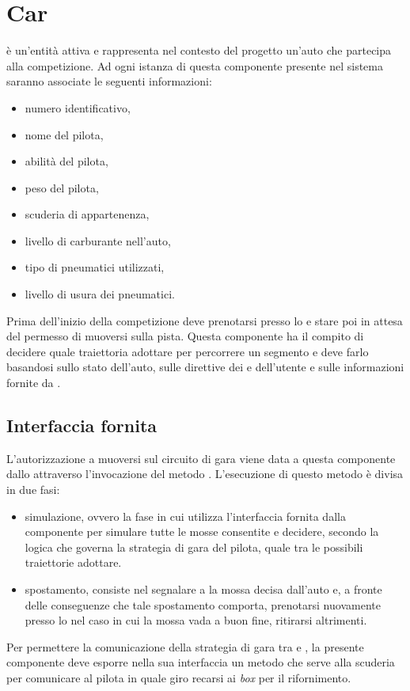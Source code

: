\section{Car}
\car{} è un'entità attiva e rappresenta nel contesto del progetto un'auto che partecipa alla competizione. Ad ogni istanza di questa componente presente nel sistema saranno associate le seguenti informazioni:
\begin{itemize}
\item numero identificativo,
\item nome del pilota,
\item abilità del pilota,
\item peso del pilota,
\item scuderia di appartenenza,
\item livello di carburante nell'auto,
\item tipo di pneumatici utilizzati,
\item livello di usura dei pneumatici.
\end{itemize}
Prima dell'inizio della competizione \car{} deve prenotarsi presso lo \sched{} e stare poi in attesa del permesso di muoversi sulla pista.
Questa componente ha il compito di decidere quale traiettoria adottare per percorrere un segmento e deve farlo basandosi sullo stato dell'auto, sulle direttive dei \team{} e dell'utente e sulle informazioni fornite da \track{}.

\subsection*{Interfaccia fornita}
L'autorizzazione a muoversi sul circuito di gara viene data a questa componente dallo \sched{} attraverso l'invocazione del metodo . L'esecuzione di questo metodo è divisa in due fasi:
\begin{itemize}
\item simulazione, ovvero la fase in cui \car{} utilizza l'interfaccia fornita dalla componente \track{} per simulare tutte le mosse consentite e decidere, secondo la logica che governa la strategia di gara del pilota, quale tra le possibili traiettorie adottare.
\item spostamento, consiste nel segnalare a \track{} la mossa decisa dall'auto e, a fronte delle conseguenze che tale spostamento comporta, prenotarsi nuovamente presso lo \sched{} nel caso in cui la mossa vada a buon fine, ritirarsi altrimenti.
\end{itemize}

Per permettere la comunicazione della strategia di gara tra \team{} e \car{}, la presente componente deve esporre nella sua interfaccia un metodo  che serve alla scuderia per comunicare al pilota in quale giro recarsi ai \textit{box} per il rifornimento.

